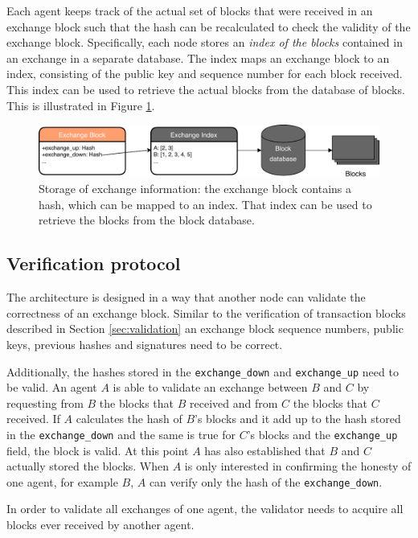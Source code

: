 Each agent keeps track of the actual set of blocks that were received in an exchange block such that 
the hash can be recalculated to check the validity of the exchange block. Specifically, each 
node stores an \textit{index of the blocks} contained in an exchange in a separate database. The 
index maps an exchange block to an index, consisting of the public key and sequence number for each
block received. This index can be 
used to retrieve the actual blocks from the database of blocks. This is illustrated in Figure \ref{fig:exchange_process}.

\begin{figure}
    \centering
    \includegraphics[width=\textwidth]{images/exchange_block_retrieval.pdf}
    \caption{Storage of exchange information: the exchange block contains a hash, which can be mapped to an index. That index can be used to retrieve the blocks from the block database.}
    \label{fig:exchange_process}
\end{figure}

\subsection{Verification protocol}
The architecture is designed in a way that another node can validate the correctness of an exchange
block. Similar to the verification of transaction blocks described in Section \ref{sec:validation} an 
exchange block sequence numbers, public keys, previous hashes and signatures need to be correct. 

Additionally, the hashes stored in the \verb|exchange_down| and \verb|exchange_up| need to be valid.
An agent $A$ is able to validate an exchange between $B$ and $C$ by requesting from $B$ the blocks 
that $B$ received and from $C$ the blocks that $C$ received. If $A$ calculates the hash of $B$'s blocks
and it add up to the hash stored in the \verb|exchange_down| and the same is true for $C$'s blocks and
the \verb|exchange_up| field, the block is valid. At this point $A$ has also established that $B$ 
and $C$ actually stored the blocks. When $A$ is only interested in confirming the honesty of one 
agent, for example $B$, $A$ can verify only the hash of the \verb|exchange_down|.

In order to validate all exchanges of one agent, the validator needs to acquire all blocks ever 
received by another agent. 

